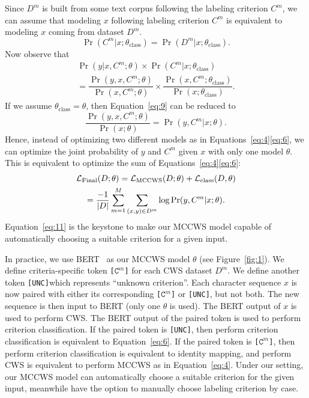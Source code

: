 \documentclass[11pt]{article}
\newcommand{\loss}{\mathcal{L}}
\newcommand{\UNC}{\texttt{[UNC]}}
\newcommand{\Ck}[1]{\texttt{[\(\mathtt{C}^{#1}\)]}}
\newcommand{\opClass}{\operatorname{class}}
\newcommand{\opMCCWS}{\operatorname{MCCWS}}
\newcommand{\opFinal}{\operatorname{Final}}
\newcommand{\thetaC}{\theta_{\opClass}}
\DeclarePairedDelimiter{\abs}{\lvert}{\rvert}
\begin{document}
Since \(D^m\) is built from some text corpus following the labeling criterion \(C^m\), we can assume that modeling \(x\) following labeling criterion \(C^m\) is equivalent to modeling \(x\) coming from dataset \(D^m\).
\begin{equation}\label{eq:8}
  \Pr(C^m | x ; \thetaC) = \Pr(D^m | x ; \thetaC).
\end{equation}
Now observe that
\begin{multline}\label{eq:9}
  \Pr(y | x, C^m ; \theta) \times \Pr(C^m | x ; \thetaC)                                                                              \\
  = \dfrac{\Pr(y, x, C^m ; \theta)}{\Pr(x, C^m ; \theta)} \times \dfrac{\Pr(x, C^m ; \thetaC)}{\Pr(x ; \thetaC)}.
\end{multline}
If we assume \(\thetaC = \theta\), then Equation~\eqref{eq:9} can be reduced to
\begin{equation}\label{eq:10}
  \dfrac{\Pr(y, x, C^m ; \theta)}{\Pr(x ; \theta)} = \Pr(y, C^m | x ; \theta).
\end{equation}
Hence, instead of optimizing two different models as in Equations~\eqref{eq:4}\eqref{eq:6}, we can optimize the joint probability of \(y\) and \(C^m\) given \(x\) with only one model \(\theta\).
This is equivalent to optimize the sum of Equations~\eqref{eq:4}\eqref{eq:6}:
\begin{multline}\label{eq:11}
  \loss_{\opFinal}(D ; \theta) = \loss_{\opMCCWS}(D ; \theta) + \loss_{\opClass}(D, \theta) \\
  = \dfrac{-1}{\abs{D}} \sum_{m = 1}^M \sum_{(x, y) \in D^m} \log \Pr(y, C^m | x ; \theta).
\end{multline}
Equation~\eqref{eq:11} is the keystone to make our MCCWS model capable of automatically choosing a suitable criterion for a given input.

In practice, we use BERT~\citep{devlin-etal-2019-bert} as our MCCWS model \(\theta\) (see Figure~\ref{fig:1}).
We define criteria-specific token \Ck{m} for each CWS dataset \(D^m\).
We define another token \UNC which represents ``unknown criterion''.
Each character sequence \(x\) is now paired with either its corresponding \Ck{m} or \UNC, but not both.
The new sequence is then input to BERT (only one \(\theta\) is used).
The BERT output of \(x\) is used to perform CWS.
The BERT output of the paired token is used to perform criterion classification.
If the paired token is \UNC, then perform criterion classification is equivalent to Equation~\eqref{eq:6}.
If the paired token is \Ck{m}, then perform criterion classification is equivalent to identity mapping, and perform CWS is equivalent to perform MCCWS as in Equation~\eqref{eq:4}.
Under our setting, our MCCWS model can automatically choose a suitable criterion for the given input, meanwhile have the option to manually choose labeling criterion by case.
\end{document}
